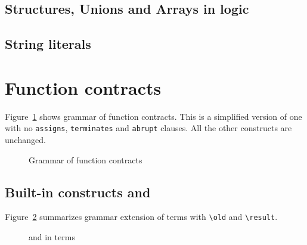 
\subsection{Structures, Unions and Arrays in logic}
\nodiff


\subsection{String literals}
\nodiff


\section{Function contracts}
\label{sec:fn-behavior}


Figure~\ref{fig:gram:contracts} shows grammar of function
contracts. This is a simplified version of \acsl one with no
\lstinline|assigns|, \lstinline|terminates| and \lstinline|abrupt|
clauses. All the other constructs are unchanged.
\begin{figure}[htbp]
  \begin{cadre}
      
   \end{cadre}
    \caption{Grammar of function contracts}
  \label{fig:gram:contracts}
\end{figure}


\subsection{Built-in constructs %
  \texorpdfstring{\old}{\textbackslash{}old} %
 and \texorpdfstring{\result}{\textbackslash{}result}}

\nodiff

Figure~\ref{fig:gram:oldandresult} summarizes grammar extension of terms with
\lstinline|\old| and \lstinline|\result|.
\begin{figure}[htbp]
  \begin{cadre}
      
    \end{cadre}
    \caption{\protect\old and \protect\result in terms}
  \label{fig:gram:oldandresult}
\end{figure}



